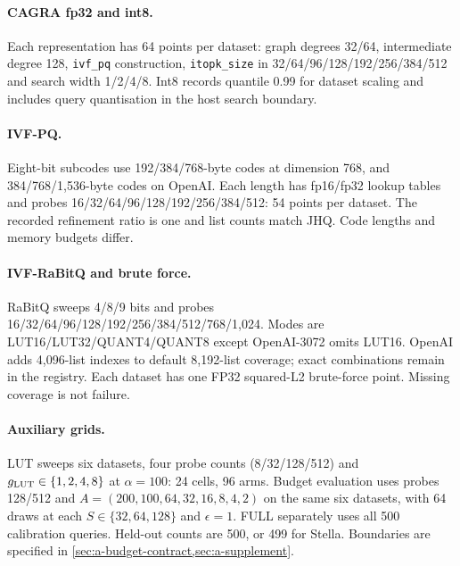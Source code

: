 \paragraph{CAGRA fp32 and int8.}
Each representation has 64 points per dataset: graph degrees 32/\allowbreak{}64,
intermediate degree 128, \texttt{ivf\_pq} construction,
\texttt{itopk\_size} in 32/\allowbreak{}64/\allowbreak{}96/\allowbreak{}128/\allowbreak{}192/\allowbreak{}256/\allowbreak{}384/\allowbreak{}512 and search width
1/\allowbreak{}2/\allowbreak{}4/\allowbreak{}8. Int8 records quantile 0.99 for dataset scaling and includes
query quantisation in the host search boundary.

\paragraph{IVF-PQ.}
Eight-bit subcodes use 192/\allowbreak{}384/\allowbreak{}768-byte codes at dimension 768,
and 384/\allowbreak{}768/\allowbreak{}1,536-byte codes on OpenAI. Each length has fp16/fp32
lookup tables and probes 16/\allowbreak{}32/\allowbreak{}64/\allowbreak{}96/\allowbreak{}128/\allowbreak{}192/\allowbreak{}256/\allowbreak{}384/\allowbreak{}512:
54 points per dataset. The recorded refinement ratio is one and list
counts match JHQ. Code lengths and memory budgets differ.

\paragraph{IVF-RaBitQ and brute force.}
RaBitQ sweeps 4/8/9 bits and probes 16/\allowbreak{}32/\allowbreak{}64/\allowbreak{}96/\allowbreak{}128/\allowbreak{}192/\allowbreak{}256/\allowbreak{}384/\allowbreak{}512/\allowbreak{}768/\allowbreak{}1,024. Modes are LUT16/LUT32/QUANT4/QUANT8 except OpenAI-3072 omits LUT16. OpenAI adds 4,096-list indexes to default 8,192-list coverage; exact combinations remain in the registry. Each dataset has one FP32 squared-L2 brute-force point. Missing coverage is not failure.

\paragraph{Auxiliary grids.}
LUT sweeps six datasets, four probe counts (8/32/128/512) and $g_{\mathrm{LUT}}\in\{1,2,4,8\}$ at $\alpha=100$: 24 cells, 96 arms.
Budget evaluation uses probes 128/\allowbreak{}512 and
$A=(200,100,64,32,16,8,4,2)$ on the same six datasets, with 64 draws
at each $S\in\{32,64,128\}$ and $\epsilon=1$. FULL separately uses
all 500 calibration queries. Held-out counts are 500, or 499 for
Stella.  Boundaries are specified in
\cref{sec:a-budget-contract,sec:a-supplement}.

